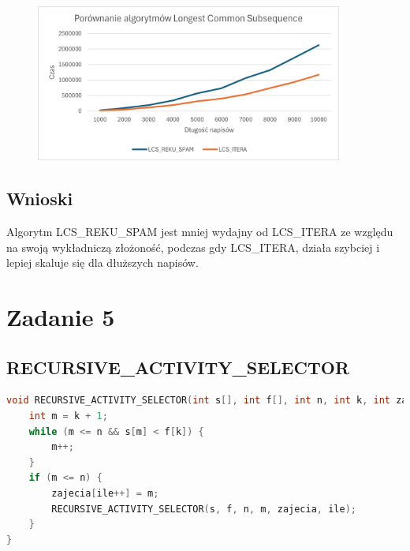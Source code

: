 \documentclass{article}
\begin{document}
	\begin{figure}[H]
		\centering
		\includegraphics[width=0.9\textwidth]{PorLSC.png}
	\end{figure}
	
	\subsection*{Wnioski} 
	Algorytm LCS\_REKU\_SPAM jest mniej wydajny od LCS\_ITERA ze względu na swoją wykładniczą złożoność, podczas gdy LCS\_ITERA, działa szybciej i lepiej skaluje się dla dłuższych napisów.
	
	\newpage
	\section*{Zadanie 5}
	\subsection*{RECURSIVE\_ACTIVITY\_SELECTOR} 
	\begin{lstlisting}[language=C++, tabsize=3, basicstyle=\footnotesize]
void RECURSIVE_ACTIVITY_SELECTOR(int s[], int f[], int n, int k, int zajecia[], int &ile) {
	int m = k + 1;
	while (m <= n && s[m] < f[k]) { 
		m++;
	}
	if (m <= n) {
		zajecia[ile++] = m; 
		RECURSIVE_ACTIVITY_SELECTOR(s, f, n, m, zajecia, ile);  
	}
}

		
	\end{lstlisting}
	
\end{document}
